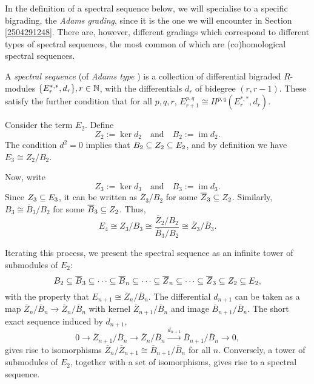 \documentclass{MetricNotes2023}
\def\subq{\ensuremath\subseteq}
\def\nat{\ensuremath\mathbb{N}}
\DeclareMathOperator{\im}{im}
\def\textcolour{\textcolor}
\begin{document}
In the definition of a spectral sequence below, we will specialise to a specific bigrading, the \textit{Adams grading}, since it is the one we will encounter in Section \ref{2504291248}. There are, however, different gradings which correspond to different types of spectral sequences, the most common of which are (co)homological spectral sequences. 

\begin{definition}
A \textit{spectral sequence} (of \textit{Adams type}%
) is a collection of differential bigraded \(R\)-modules \(\{E^{*, *}_r, d_r\}, r \in \nat\), with the differentials \(d_r\) of bidegree \((r, r-1)\). These satisfy the further condition that for all \(p, q, r\), \(E^{p, q}_{r+1}\cong H^{p, q}(E_r^{*, *}, d_r)\).
\end{definition}

Consider the term \(E_2\). Define 
\[Z_2:=\ker d_2 \quad \text{and} \quad B_2:=\im d_2.\]
The condition \(d^2=0\) implies that \(B_2\subq Z_2\subq E_2\), and by definition we have \(E_3\cong Z_2/B_2\). 

Now, write 
\[Z_3:=\ker d_3 \quad \text{and} \quad B_3:=\im d_3.\]
Since \(Z_3\subq E_3\), it can be written as \(\overline{Z}_3/B_2\) for some \(\overline{Z}_3\subq Z_2\). Similarly, \(B_3\cong \overline B_3/B_2\) for some \(\overline B_3\subq Z_2\). Thus,
\[E_4\cong Z_3/B_3\cong \frac{\overline Z_2/B_2}{\overline B_3/B_2}\cong \overline Z_3/\overline B_3.\]

Iterating this process, we present the spectral sequence as an infinite tower of submodules of \(E_2\):
\[B_2\subq \overline B_3\subq \cdots \subq \overline B_n\subq \cdots \subq \overline Z_n\subq \cdots \subq \overline Z_3\subq Z_2\subq E_2,\]
with the property that \(E_{n+1}\cong \overline Z_n/\overline B_n\). The differential \(d_{n+1}\) can be taken as a map \(\overline Z_n/\overline B_n\to\overline Z_n/\overline B_n\) with kernel \(\overline Z_{n+1}/\overline B_n\) and image \(\overline B_{n+1}/\overline B_n\). The short exact sequence induced by \(d_{n+1}\),
\[0 \to \overline Z_{n+1}/\overline B_n\to \overline Z_n/\overline B_n \xrightarrow{d_{n+1}} \overline B_{n+1}/\overline{B}_n\to 0,\]
gives rise to isomorphisms \(\overline{Z}_n/\overline{Z}_{n+1}\cong \overline{B}_{n+1}/\overline{B}_n\) for all \(n\). Conversely, a tower of submodules of \(E_2\), together with a set of isomorphisms, gives rise to a spectral sequence. 
\end{document}
